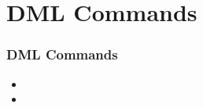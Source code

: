 \section{DML  Commands}
\begin{frame}

	\frametitle{ DML  Commands}
	
	\begin{itemize}
	
	    \item
	
	    \item
	
	\end{itemize}
	
\end{frame}